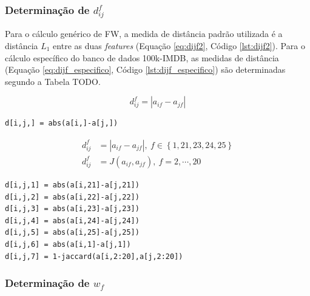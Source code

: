 
\subsubsection{Determinação de $d_{ij}^f$} %
\label{ssub:determina_o_de_d__ij_f_}

Para o cálculo genérico de FW, a medida de distância padrão utilizada é a distância $L_1$ entre as duas \textit{features} (Equação \ref{eq:dijf2}, Código \ref{lst:dijf2}). Para o cálculo específico do banco de dados 100k-IMDB, as medidas de distância (Equação \ref{eq:dijf_especifico}, Código \ref{lst:dijf_especifico}) são determinadas segundo a Tabela TODO. 

\begin{equation}
\label{eq:dijf2}
d_{ij}^f = \left|a_{if} - a_{jf}\right|
\end{equation}

\begin{lstlisting}[caption=Determinação de $d_{ij}$ genérico,label=lst:dijf2]
d[i,j,] = abs(a[i,]-a[j,])
\end{lstlisting}

\begin{equation}
\label{eq:dijf_especifico}
\begin{split}
d_{ij}^f &= \left|a_{if} - a_{jf}\right|,~f \in \left\{1,21,23,24,25\right\} \\
d_{ij}^f &= J(a_{if},a_{jf}),~f = 2, \cdots, 20
\end{split}
\end{equation}


\begin{lstlisting}[caption=Determinação de $d_{ij}$ específico,label=lst:dijf_especifico]
d[i,j,1] = abs(a[i,21]-a[j,21])  
d[i,j,2] = abs(a[i,22]-a[j,22])  
d[i,j,3] = abs(a[i,23]-a[j,23])  
d[i,j,4] = abs(a[i,24]-a[j,24])  
d[i,j,5] = abs(a[i,25]-a[j,25])  
d[i,j,6] = abs(a[i,1]-a[j,1])    
d[i,j,7] = 1-jaccard(a[i,2:20],a[j,2:20])
\end{lstlisting}

\subsubsection{Determinação de $w_f$} %
\label{ssub:determina_o_de_w_f_}


